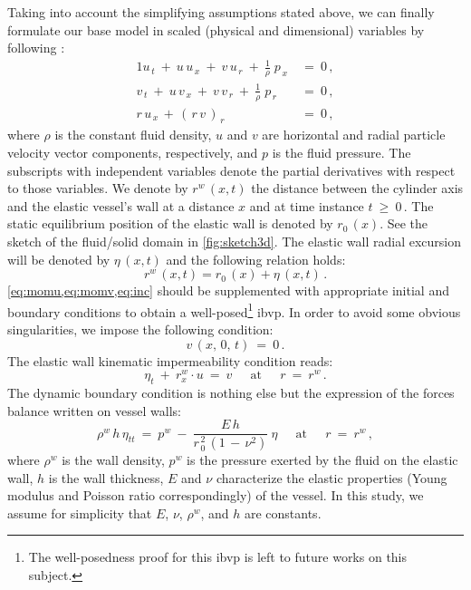 \documentclass[alpha-refs, 12pt]{wiley-article}
\renewcommand{\geq}{\geqslant}
\begin{document}
Taking into account the simplifying assumptions stated above, we can finally formulate our base model in scaled (physical and dimensional) variables by following \cite{Mitsotakis2018, Mitsotakis2019}:
\begin{alignat}{1}
   u_{\,t}\ +\ u\,u_{\,x}\ +\ v\,u_{\,r}\ +\ \frac{1}{\rho}\;p_{\,x}\ &=\ 0\,, \label{eq:momu} \\
   v_{\,t}\ +\ u\,v_{\,x}\ +\ v\,v_{\,r}\ +\ \frac{1}{\rho}\;p_{\,r}\ &=\ 0\,, \label{eq:momv} \\
   r\,u_{\,x}\,+\,(\,r\,v\,)_{\,r}\ &=\ 0\,, \label{eq:inc}
\end{alignat}
where $\rho$ is the constant fluid density, $u$ and $v$ are horizontal and radial particle velocity vector components, respectively, and $p$ is the fluid pressure. The subscripts with independent variables denote the partial derivatives with respect to those variables. We denote by $r^{w}\,(x,t)$ the distance between the cylinder axis and the elastic vessel's wall at a distance $x$ and at time instance $t\ \geq\ 0\,$. The static equilibrium position of the elastic wall is denoted by $r_{0}\,(x)$. See the sketch of the fluid/solid domain in \cref{fig:sketch3d}. The elastic wall radial excursion will be denoted by $\eta\,(x,t)$ and the following relation holds:
\begin{equation*}
    r^{w}\,(x,t) = r_{0}\,(x) + \eta\,(x,t)\,.
\end{equation*}
\cref{eq:momu,eq:momv,eq:inc} should be supplemented with appropriate initial and boundary conditions to obtain a well-posed\footnote{The well-posedness proof for this \gls{ibvp} is left to future works on this subject.} \gls{ibvp}. In order to avoid some obvious singularities, we impose the following condition:
\begin{equation*}
    v\,(x,\,0,\,t)\ =\ 0\,.
\end{equation*}
The elastic wall kinematic impermeability condition reads:
\begin{equation*}
  \eta_{t}\ +\ r^{w}_{x}\cdot u\ =\ v\ \quad\ \mbox{at}\ \quad\ r\ =\ r^{w}\,.
\end{equation*}
The dynamic boundary condition is nothing else but the expression of the forces balance written on vessel walls:
\begin{equation*}
    \rho^{w}\,h\,\eta_{tt}\ =\ p^{w}\ -\ \frac{E\,h}{r_{\,0}^{\,2}\,(1\,-\,\nu^2)}\:\eta\ \quad\ \mbox{at}\ \quad\ r\ =\ r^{w}\,,
\end{equation*}
where $\rho^{w}$ is the wall density, $p^{w}$ is the pressure exerted by the fluid on the elastic wall, $h$ is the wall thickness, $E$ and $\nu$ characterize the elastic properties (Young modulus and Poisson ratio correspondingly) of the vessel. In this study, we assume for simplicity that $E$, $\nu$, $\rho^{w}$, and $h$ are constants.
\end{document}
